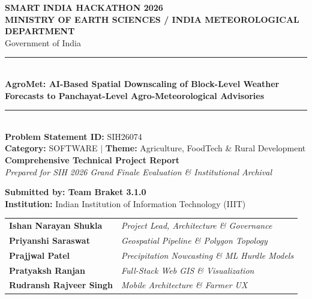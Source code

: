 \documentclass[11pt,a4paper,oneside]{report}
\begin{document}
\begin{titlepage}
\begin{center}

{\Large \textbf{\color{crimson}SMART INDIA HACKATHON 2026}}\\[0.25cm]
{\large \textbf{MINISTRY OF EARTH SCIENCES / INDIA METEOROLOGICAL DEPARTMENT}}\\[0.15cm]
{\small Government of India}\\[0.8cm]

\rule{\linewidth}{1.5pt}\\[0.4cm]
{\Huge \textbf{\color{navyblue}AgroMet: AI-Based Spatial Downscaling of Block-Level Weather Forecasts to Panchayat-Level Agro-Meteorological Advisories}}\\[0.3cm]
\rule{\linewidth}{1.5pt}\\[0.5cm]

{\large \textbf{Problem Statement ID:} SIH26074}\\[0.15cm]
{\normalsize \textbf{Category:} SOFTWARE \quad $|$ \quad \textbf{Theme:} Agriculture, FoodTech \& Rural Development}\\[0.5cm]

\textbf{\large Comprehensive Technical Project Report}\\
\textit{Prepared for SIH 2026 Grand Finale Evaluation \& Institutional Archival}\\[0.8cm]

\begin{tcolorbox}[colback=lightslate,colframe=navyblue,width=0.92\linewidth,arc=2mm]
\centering
\textbf{\large Submitted by: Team Braket 3.1.0}\\[0.2cm]
\textbf{Institution:} Indian Institution of Information Technology (IIIT)\\[0.25cm]
\begin{tabular}{ll}
\textbf{Ishan Narayan Shukla} & \textit{Project Lead, Architecture \& Governance} \\
\textbf{Priyanshi Saraswat} & \textit{Geospatial Pipeline \& Polygon Topology} \\
\textbf{Prajjwal Patel} & \textit{Precipitation Nowcasting \& ML Hurdle Models} \\
\textbf{Pratyaksh Ranjan} & \textit{Full-Stack Web GIS \& Visualization} \\
\textbf{Rudransh Rajveer Singh} & \textit{Mobile Architecture \& Farmer UX} \\
\end{tabular}
\end{tcolorbox}


\end{center}
\end{titlepage}
\end{document}
